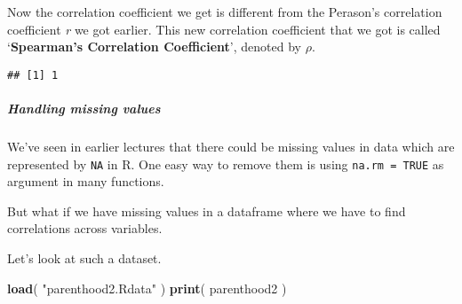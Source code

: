 \documentclass[
]{article}
\newenvironment{Shaded}{\begin{snugshade}}{\end{snugshade}}
\newcommand{\AttributeTok}[1]{\textcolor[rgb]{0.13,0.29,0.53}{#1}}
\newcommand{\CommentTok}[1]{\textcolor[rgb]{0.56,0.35,0.01}{\textit{#1}}}
\newcommand{\FunctionTok}[1]{\textcolor[rgb]{0.13,0.29,0.53}{\textbf{#1}}}
\newcommand{\NormalTok}[1]{#1}
\newcommand{\SpecialCharTok}[1]{\textcolor[rgb]{0.81,0.36,0.00}{\textbf{#1}}}
\newcommand{\StringTok}[1]{\textcolor[rgb]{0.31,0.60,0.02}{#1}}
\begin{document}
Now the correlation coefficient we get is different from the Perason's
correlation coefficient \emph{r} we got earlier. This new correlation
coefficient that we got is called `\textbf{Spearman's Correlation
Coefficient}', denoted by \(\rho\).

\begin{Shaded}
\end{Shaded}

\begin{verbatim}
## [1] 1
\end{verbatim}

\subparagraph{Handling missing values}\label{handling-missing-values}

We've seen in earlier lectures that there could be missing values in
data which are represented by \texttt{NA} in R. One easy way to remove
them is using \texttt{na.rm\ =\ TRUE} as argument in many functions.

But what if we have missing values in a dataframe where we have to find
correlations across variables.

Let's look at such a dataset.

\begin{Shaded}
\begin{Highlighting}[]
\FunctionTok{load}\NormalTok{( }\StringTok{"parenthood2.Rdata"}\NormalTok{ )}
\FunctionTok{print}\NormalTok{( parenthood2 )}
\end{Highlighting}
\end{Shaded}
\end{document}
